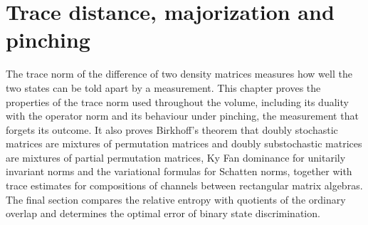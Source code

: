 \chapter{Trace distance, majorization and pinching}
\label{ch:trace_distance}

The trace norm of the difference of two density matrices measures how well the
two states can be told apart by a measurement. This chapter proves the
properties of the trace norm used throughout the volume, including its duality
with the operator norm and its behaviour under pinching, the measurement that
forgets its outcome. It also proves Birkhoff's theorem that doubly stochastic
matrices are mixtures of permutation matrices and doubly substochastic
matrices are mixtures of partial permutation matrices, Ky Fan dominance for
unitarily invariant norms and the variational formulas for Schatten norms,
together with trace estimates for compositions of channels between
rectangular matrix algebras. The final section compares the relative entropy
with quotients of the ordinary overlap and determines the optimal error of
binary state discrimination.









